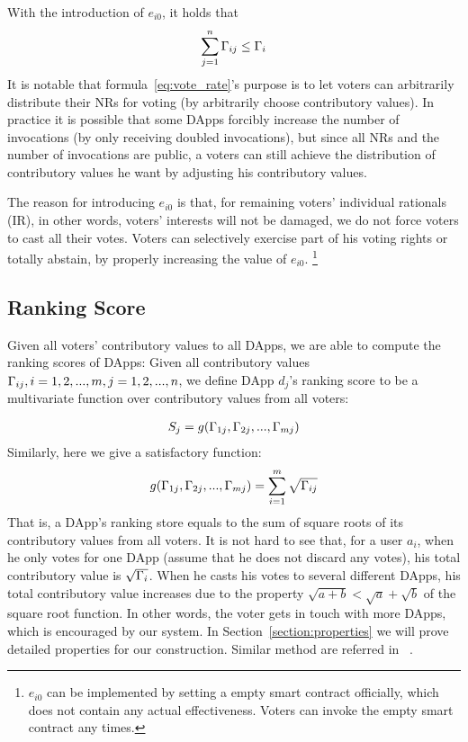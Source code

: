 With the introduction of $e_{i0}$, it holds that 
$$\sum_{j=1}^n \Gamma_{ij} \leq \Gamma_i$$
\noindent It is notable that formula~\ref{eq:vote_rate}'s purpose is to let voters can arbitrarily distribute their NRs for voting (by arbitrarily choose contributory values). In practice it is possible that some DApps forcibly increase the number of invocations (by only receiving doubled invocations), but since all NRs and the number of invocations are public, a voters can still achieve the distribution of contributory values he want by adjusting his contributory values.

The reason for introducing $e_{i0}$ is that, for remaining voters' individual rationals (IR), in other words, voters' interests will not be damaged, we do not force voters to cast all their votes. Voters can selectively exercise part of his voting rights or totally abstain, by properly increasing the value of $e_{i0}$. \footnote{ $e_{i0}$ can be implemented by setting a empty smart contract officially, which does not contain any actual effectiveness. Voters can invoke the empty smart contract any times.}
\subsection{Ranking Score}
Given all voters' contributory values to all DApps, we are able to compute the ranking scores of DApps: Given all contributory values $\Gamma_{ij},i=1,2,...,m,j=1,2,...,n$, we define DApp $d_j$'s ranking score to be a multivariate function over contributory values from all voters:

\begin{align}
	S_j = g(\Gamma_{1j},\Gamma_{2j},...,\Gamma_{mj})
\end{align}
Similarly, here we give a satisfactory function:
\begin{align}
	\label{eq:sqrt}
	g(\Gamma_{1j},\Gamma_{2j},...,\Gamma_{mj}) = \sum_{i=1}^m \sqrt{\Gamma_{ij}}
\end{align}
That is, a DApp's ranking store equals to the sum of square roots of its contributory values from all voters. It is not hard to see that, for a user $a_i$, when he only votes for one DApp (assume that he does not discard any votes), his total contributory value is $\sqrt{\Gamma_i}$. When he casts his votes to several different DApps, his total contributory value increases due to the property $\sqrt{a+b}<\sqrt{a}+\sqrt{b}$ of the square root function. In other words, the voter gets in touch with more DApps, which is encouraged by our system. In Section~\ref{section:properties} we will prove  detailed properties for our construction. Similar method are referred in ~\cite{buterin2018liberal}.


